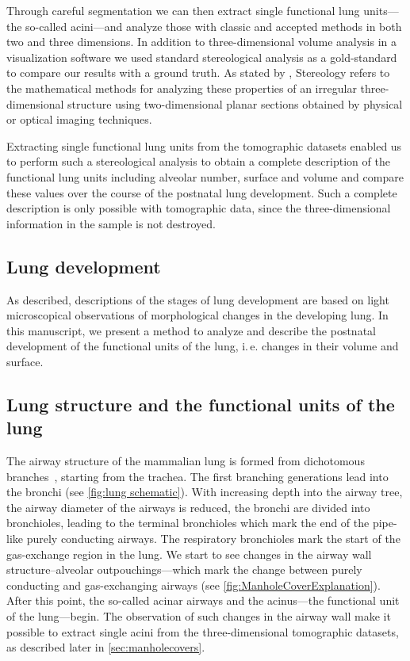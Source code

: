 \documentclass[%
	paper=a4,%
	abstract=true,%
	]{scrartcl}
\newcommand{\ie}{i.\,e.\xspace}
\begin{document}
Through careful segmentation we can then extract single functional lung units---the so-called acini---and analyze those with classic and accepted methods in both two and three dimensions. In addition to three-dimensional volume analysis in a visualization software we used standard stereological analysis \cite{Hsia2010} as a gold-standard to compare our results with a ground truth. As stated by \citet{Hsia2010}, Stereology refers to the mathematical methods for analyzing these properties of an irregular three-dimensional structure using two-dimensional planar sections obtained by physical or optical imaging techniques.

Extracting single functional lung units from the tomographic datasets enabled us to perform such a stereological analysis to obtain a complete description of the functional lung units including alveolar number, surface and volume and compare these values over the course of the postnatal lung development. Such a complete description is only possible with tomographic data, since the three-dimensional information in the sample is not destroyed.

\subsection{Lung development}
As \citet{Schittny2007a} described, descriptions of the stages of lung development are based on light microscopical observations of morphological changes in the developing lung. In this manuscript, we present a method to analyze and describe the postnatal development of the functional units of the lung, \ie changes in their volume and surface.

\subsection{Lung structure and the functional units of the lung}
The airway structure of the mammalian lung is formed from dichotomous branches~\cite{Weibel1991}, starting from the trachea. The first branching generations lead into the bronchi (see \autoref{fig:lung schematic}). With increasing depth into the airway tree, the airway diameter of the airways is reduced, the bronchi are divided into bronchioles, leading to the terminal bronchioles which mark the end of the pipe-like purely conducting airways. The respiratory bronchioles mark the start of the gas-exchange region in the lung. We start to see changes in the airway wall structure--alveolar outpouchings---which mark the change between purely conducting and gas-exchanging airways (see \autoref{fig:ManholeCoverExplanation}). After this point, the so-called acinar airways and the acinus---the functional unit of the lung---begin. The observation of such changes in the airway wall make it possible to extract single acini from the three-dimensional tomographic datasets, as described later in \autoref{sec:manholecovers}.
\end{document}
